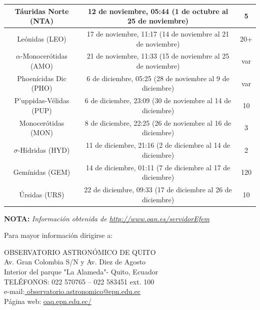 \documentclass[12pt,a4paper,oneside]{article}
\begin{document}
\begin{table}[h!b!t!]
\begin{center}
{\begin{tabular}{|c|c|c|}
T\'auridas Norte (NTA) &	12 de noviembre, 05:44 (1 de octubre al 25 de noviembre) &	5\\ 
\hline 
Le\'onidas (LEO) &	17 de noviembre, 11:17 (14 de noviembre al 21 de noviembre) &	20+\\ 
\hline 
$\alpha$-Monocer\'otidas (AMO) &	21 de noviembre, 11:33 (15 de noviembre al 25 de noviembre) &var\\ 
\hline 
Phoen\'icidas Dic (PHO) &	6 de diciembre, 05:25 (28 de noviembre al 9 de diciembre) &	var\\ 
\hline 
P'uppidas-V\'elidas (PUP) &	6 de diciembre, 23:09 (30 de noviembre al 14 de diciembre) &	10\\ 
\hline 
Monocer\'otidas (MON) & 	8 de diciembre, 22:25 (26 de noviembre al 16 de diciembre) &3\\ 
\hline 
$\sigma$-H\'idridas (HYD) &	11 de diciembre, 21:16 (2 de diciembre al 14 de diciembre) &	2\\ 
\hline 
Gem\'inidas (GEM) & 	14 de diciembre, 01:11 (7 de diciembre al 17 de diciembre) &	120\\ 
\hline 
\'Ursidas (URS) &	22 de diciembre, 09:33 (17 de diciembre al 26 de diciembre) & 10\\ 
\hline 
 \end{tabular} }
\end{center}
\end{table}
\textbf{NOTA:  }\textit{Informaci\'on obtenida de \url{http://www.oan.es/servidorEfem}}

\vspace{1cm}
Para mayor información dirigirse a: \\
\begin{center}
OBSERVATORIO ASTRONÓMICO DE QUITO\\
\footnotesize Av. Gran Colombia S/N y Av. Diez de Agosto\\
\footnotesize Interior del parque "La Alameda"- Quito, Ecuador \\

\footnotesize TELÉFONOS: 022 570765 – 022 583451 ext. 100\\



\footnotesize e-mail:\url{ observatorio.astronomico@epn.edu.ec}\\
\footnotesize Página web: \url{oaq.epn.edu.ec/}
\end{center}
\end{document}
